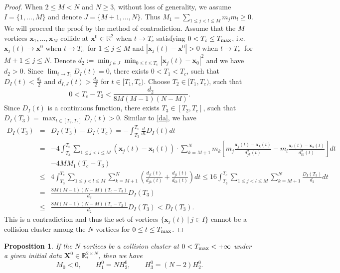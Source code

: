 \documentclass{aims}
\theoremstyle{plain}
\newtheorem{proposition}{Proposition}[section]
\theoremstyle{definition}
\newcommand{\bx}{{\mathbf x}}
\newcommand{\bX}{{\mathbf X}}
\newcommand{\nn}{\nonumber}
\newcommand{\be} {\begin{equation}}
\newcommand{\ee}{\end{equation}}
\newcommand{\bea}{\begin{eqnarray}}
\newcommand{\eea}{\end{eqnarray} }
\begin{document}
\begin{proof}
When $2\le M<N$ and $N\ge3$, without loss of generality,
we assume $I=\{1,\ldots,M\}$ and denote $J=\{M+1,\ldots,N\}$.
Thus $M_1=\sum_{1\le j< l\le M}m_jm_l\ge0$.
We will proceed the proof by the method of
contradiction. Assume that the $M$ vortices $\bx_1,\ldots,\bx_M$ collide
at $\bx^0\in {\mathbb R}^2$ when $t\to T_c$ satisfying $0<T_c\le T_{\rm max}$, i.e.  $\bx_j(t)\to \bx^0$ when $t\to T_{c}^-$ for $1\le j\le M$
and $|\bx_j(t)-\bx^0|>0$ when $t\to T_{c}^-$ for $M+1\le j\le N$.
Denote $d_2:=\displaystyle\min_{j\in
J}\min_{0\le t \le T_c}|\mathbf x_j(t)-\mathbf x_0|^2$ and we have
$d_2>0$.
Since $\displaystyle\lim_{t\rightarrow T_{c}}D_{I}(t)=0$,
 there exists $0<T_1<T_{c}$, such that $D_{I}(t)<\frac{d_2}{2}$ and
 $d_{I,J}(t)>\frac{d_2}{2}$ for
 $t\in[T_1,T_{c})$.  Choose
$T_2\in[T_1,T_{c})$, such that
$$
0<T_{c}-T_2<\frac{d_2}{8M(M-1)(N-M)}.
$$
Since $D_{I}(t)$ is a continuous function, there exists $T_3\in[T_2,
T_{c}]$, such that $
D_{I}(T_3)=\max_{t\in[T_2,T_{c}]}D_{I}(t)>0$. Similar to \eqref{da}, we have
\bea
D_{I}(T_3)&=&D_{I}(T_3)-D_{I}(T_c)=
-\int_{T_3}^{T_{c}}\frac{d}{dt}D_I(t)dt \nn\\
&=&-4\int_{T_3}^{T_{c}}\sum_{1\leq j<l \leq M}(\mathbf x_j(t)-\mathbf
x_l(t))\cdot \sum_{k=M+1}^N m_k\left[m_j\frac{\mathbf
x_j(t)-\mathbf x_k(t)}{d_{jk}^2(t)}-m_l\frac{\mathbf x_l(t)-\mathbf
x_k(t)}{d_{lk}^2(t)}\right]dt\nn\\
&&-4MM_1(T_c-T_3)\nn\\
&\le&4\int_{T_3}^{T_{c}}\sum_{1\leq j<l \leq M}\sum_{k=M+1}^N
\left(\frac{d_{jl}(t)}{d_{jk}(t)}+
\frac{d_{jl}(t)}{d_{lk}(t)}\right)dt
\le16\int_{T_3}^{T_{c}}\sum_{1\leq j<l \leq
M}\sum_{k=M+1}^N\frac{D_{I}(T_3)}{d_2}dt\nn\\
&=&\frac{8M(M-1)(N-M)(T_c-T_{3})}{d_2}D_{I}(T_3)\nn\\
&\le&\frac{8M(M-1)(N-M)(T_c-T_{2})}{d_2}D_{I}(T_3) <D_{I}(T_3).\nonumber
\eea
This is a contradiction and thus the set
of vortices $\{\bx_j(t) \ |\ j\in I\}$ cannot be a collision cluster
among the $N$ vortices  for $0\le t\le T_{\rm max}$.
\end{proof}


\begin{proposition}\label{total}
If the $N$ vortices be a collision cluster at
$0<T_{\rm max}<+\infty$ under a given initial data
$\bX^0\in {\mathbb R}_*^{2\times N}$,
then we have
\be\label{M0clu56}
M_0<0, \qquad H_1^0=N H_2^0, \qquad H_3^0=(N-2)H_2^0.
\ee
\end{proposition}
\end{document}
